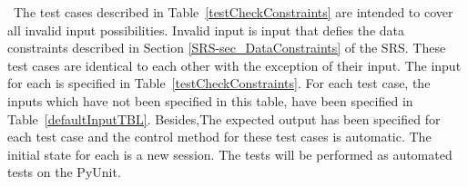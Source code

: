\documentclass[12pt, titlepage]{article}
\begin{document}
~\newline \noindent The test cases described in Table~\ref{testCheckConstraints} 
are intended to cover all invalid input possibilities. Invalid input is input 
that defies the data constraints described in Section 
\ref{SRS-sec_DataConstraints} of the SRS. These test cases are identical to 
each other with the exception of their input. The input for each is specified 
in Table~\ref{testCheckConstraints}. For each test case, the inputs which have not been specified 
in this table, have been specified in Table~\ref{defaultInputTBL}. Besides,The expected output has been specified for each test case and the control method 
for these test cases is automatic. The initial state for each is a new session. 
The tests will be performed as automated tests on the PyUnit.

\end{document}
